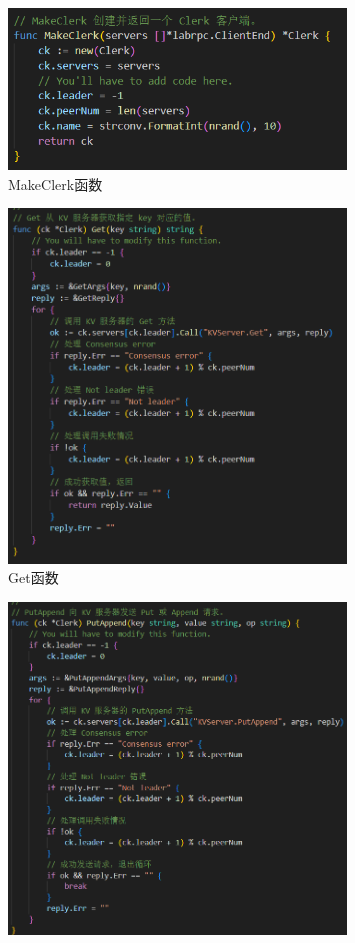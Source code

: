 \documentclass[]{article}
\begin{document}
\begin{itemize}
\begin{figure}[H]
			\centering
			\includegraphics[width=0.8\textwidth]{./3A/MakeClerk.png}
			\caption{MakeClerk函数}
		\end{figure}
		\begin{figure}[H]
			\centering
			\includegraphics[width=0.8\textwidth]{./3A/client-Get.png}
			\caption{Get函数}
		\end{figure}
		\begin{figure}[H]
			\centering
			\includegraphics[width=0.8\textwidth]{./3A/client-PutAppend.png}

\end{figure}
\end{itemize}
\end{document}
